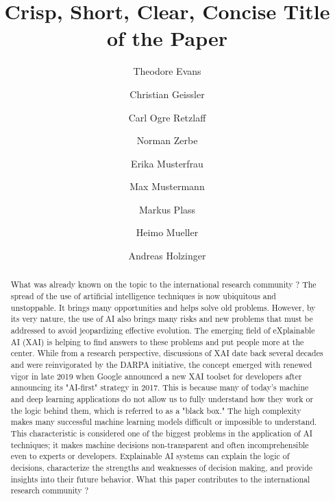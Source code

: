 \documentclass[a4paper,5p,review]{elsarticle}
\def\corref#1{}%
\begin{document}
\begin{frontmatter}

\title{Crisp, Short, Clear, Concise Title of the Paper}

\author[TUB]{Theodore Evans\corref{mycorrespondingauthor}}
\author[TUB]{Christian Geissler}
\author[TUB]{Carl Ogre Retzlaff}
\author[CAR]{Norman Zerbe}
\author[xxx]{Erika Musterfrau}
\author[xxx]{Max Mustermann}
\author[MUG]{Markus Plass}
\author[MUG]{Heimo Mueller}
\author[MUG,amii]{Andreas Holzinger }


\address[TUB]{DAI, Technical University Berlin, Germany}
\address[MUG]{Medical University Graz, Austria}
\address[amii]{Alberta Machine Intelligence Institute, Canada}
\address[xxx]{Lab Name, University Name, Address}

\begin{abstract} 
What was already known on the topic to the international research community ?
The spread of the use of artificial intelligence techniques is now ubiquitous and unstoppable. It brings many opportunities and helps solve old problems. However, by its very nature, the use of AI also brings many risks and new problems that must be addressed to avoid jeopardizing effective evolution. The emerging field of eXplainable AI (XAI) is helping to find answers to these problems and put people more at the center.
While from a research perspective, discussions of XAI date back several decades and were reinvigorated by the DARPA initiative, the concept emerged with renewed vigor in late 2019 when Google announced a new XAI toolset for developers after announcing its "AI-first" strategy in 2017. This is because many of today's machine and deep learning applications do not allow us to fully understand how they work or the logic behind them, which is referred to as a "black box." The high complexity makes many successful machine learning models difficult or impossible to understand. This characteristic is considered one of the biggest problems in the application of AI techniques; it makes machine decisions non-transparent and often incomprehensible even to experts or developers. Explainable AI systems can explain the logic of decisions, characterize the strengths and weaknesses of decision making, and provide insights into their future behavior.
What this paper contributes to the international research community ?


\end{abstract}
\end{frontmatter}
\end{document}
